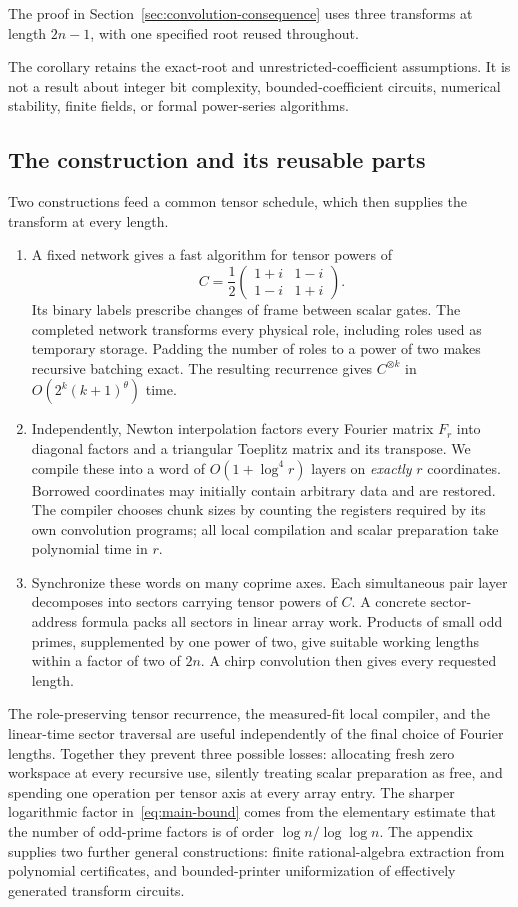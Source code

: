 The proof in Section~\ref{sec:convolution-consequence} uses three transforms
at length $2n-1$, with one specified root reused throughout.

The corollary retains the exact-root and unrestricted-coefficient assumptions.
It is not a result about integer bit complexity, bounded-coefficient circuits,
numerical stability, finite fields, or formal power-series algorithms.

\subsection{The construction and its reusable parts}

Two constructions feed a common tensor schedule, which then supplies
the transform at every length.

\begin{enumerate}
\item A fixed network gives a fast algorithm for tensor powers of
\[
 C=\frac12\begin{pmatrix}1+i&1-i\\1-i&1+i\end{pmatrix}.
\]
Its binary labels prescribe changes of frame between scalar gates. The completed network transforms every physical role, including roles used as temporary storage. Padding the number of roles to a power of two makes recursive batching exact. The resulting recurrence gives $C^{\otimes k}$ in $O(2^k(k+1)^\theta)$ time.
\item Independently, Newton interpolation factors every Fourier matrix $F_r$
into diagonal factors and a triangular Toeplitz matrix and its transpose.
We compile these into a word of $O(1+\log^4r)$ layers on \emph{exactly}
$r$ coordinates. Borrowed coordinates may initially contain arbitrary data and are restored. The compiler chooses chunk sizes by counting the registers required by its own convolution programs; all local compilation and scalar preparation take polynomial time in $r$.
\item Synchronize these words on many coprime axes. Each simultaneous pair layer decomposes into sectors carrying tensor powers of $C$. A concrete sector-address formula packs all sectors in linear array work. Products of small odd primes, supplemented by one power of two, give suitable working lengths within a factor of two of $2n$. A chirp convolution then gives every requested length.
\end{enumerate}

The role-preserving tensor recurrence, the measured-fit local compiler, and the linear-time sector traversal are useful independently of the final choice of Fourier lengths. Together they prevent three possible losses: allocating fresh zero workspace at every recursive use, silently treating scalar preparation as free, and spending one operation per tensor axis at every array entry. The sharper logarithmic factor in~\eqref{eq:main-bound} comes from the elementary estimate that the number of odd-prime factors is of order $\log n/\log\log n$. The appendix supplies two further general constructions: finite rational-algebra extraction from polynomial certificates, and bounded-printer uniformization of effectively generated transform circuits.

